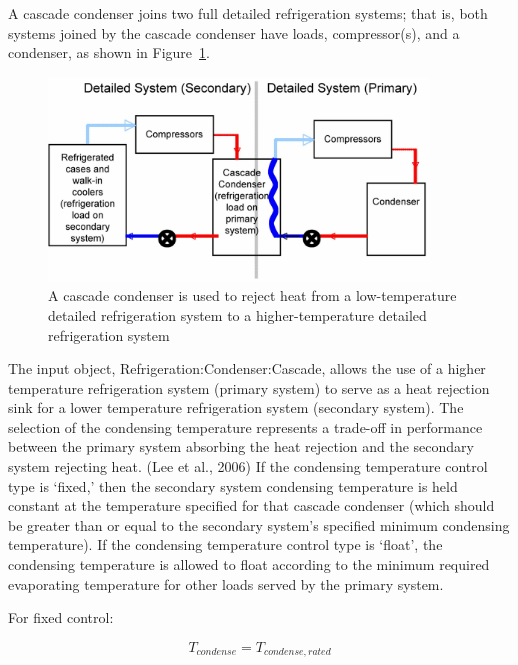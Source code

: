 A cascade condenser joins two full detailed refrigeration systems; that is, both systems joined by the cascade condenser have loads, compressor(s), and a condenser, as shown in Figure~\ref{fig:a-cascade-condenser-is-used-to-reject-heat}.

\begin{figure}[hbtp] %
\centering
\includegraphics[width=0.9\textwidth, height=0.9\textheight, keepaspectratio=true]{media/image6310.png}
\caption{A cascade condenser is used to reject heat from a low-temperature detailed refrigeration system to a higher-temperature detailed refrigeration system \protect \label{fig:a-cascade-condenser-is-used-to-reject-heat}}
\end{figure}

The input object, Refrigeration:Condenser:Cascade, allows the use of a higher temperature refrigeration system (primary system) to serve as a heat rejection sink for a lower temperature refrigeration system (secondary system). The selection of the condensing temperature represents a trade-off in performance between the primary system absorbing the heat rejection and the secondary system rejecting heat. (Lee et al., 2006) If the condensing temperature control type is `fixed,' then the secondary system condensing temperature is held constant at the temperature specified for that cascade condenser (which should be greater than or equal to the secondary system's specified minimum condensing temperature). If the condensing temperature control type is `float', the condensing temperature is allowed to float according to the minimum required evaporating temperature for other loads served by the primary system.

For fixed control:

\begin{equation}
T_{condense} = T_{condense,rated}
\end{equation}

